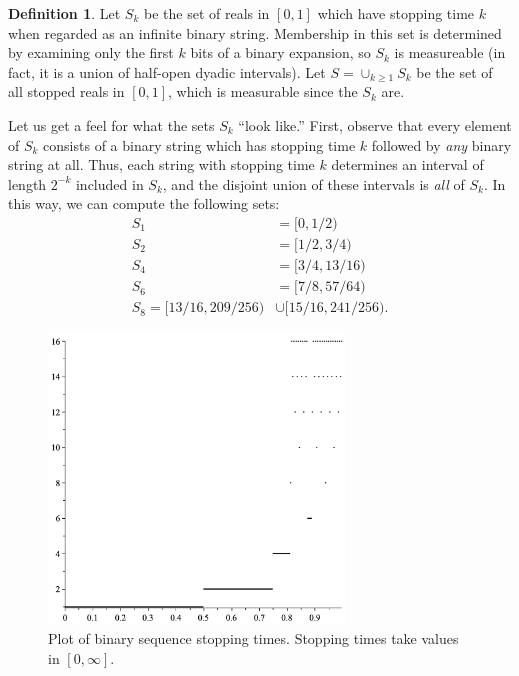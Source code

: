 \documentclass[12pt]{amsart}
\theoremstyle{definition}
\newtheorem{definition}{Definition}
\begin{document}
\begin{definition}
    Let $S_k$ be the set of reals in $[0, 1]$ which have stopping time $k$ when
    regarded as an infinite binary string. Membership in this set is determined
    by examining only the first $k$ bits of a binary expansion, so $S_k$ is
    measureable (in fact, it is a union of half-open dyadic intervals). Let $S = \cup_{k \geq 1} S_k$ be the set of all stopped reals
    in $[0, 1]$, which is measurable since the $S_k$ are.
\end{definition}

Let us get a feel for what the sets $S_k$ ``look like.'' First, observe that
every element of $S_k$ consists of a binary string which has stopping time $k$
followed by \emph{any} binary string at all. Thus, each string with stopping
time $k$ determines an interval of length $2^{-k}$ included in $S_k$, and the
disjoint union of these intervals is \emph{all} of $S_k$. In this way, we can
compute the following sets:
\begin{align*}
    S_1 &= [0, 1/2) \\
    S_2 &= [1/2, 3/4) \\
    S_4 &= [3/4, 13/16) \\
    S_6 &= [7/8, 57/64) \\
    S_8 = [13/16, 209/256) &\cup [15/16, 241/256).
\end{align*}

\begin{figure}
\includegraphics[width=0.7\textwidth]{fig1.png}
\caption{Plot of binary sequence stopping times. Stopping times take values in $[0,\infty].$}
\end{figure}
\end{document}
